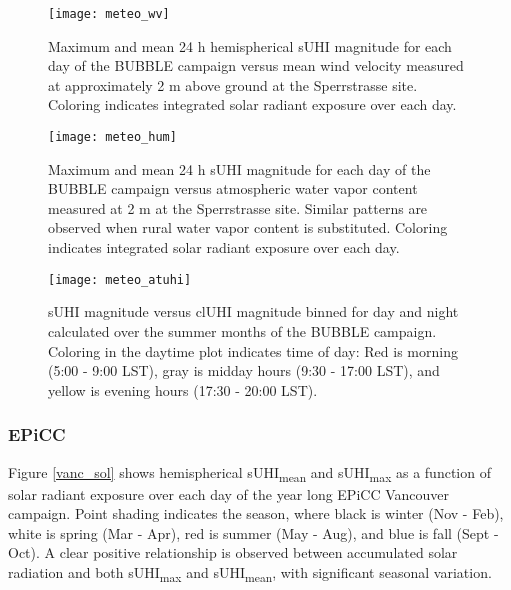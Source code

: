 \begin{bibunit}
\begin{figure}[H]
	\centering
	\texttt{[image: meteo\_wv]}
	\caption{Maximum and mean 24 \si{\hour} hemispherical sUHI magnitude for each day of the BUBBLE campaign versus mean wind velocity measured at approximately 2 \si{\meter} above ground at the Sperrstrasse site. Coloring indicates integrated solar radiant exposure over each day.}
	\label{meteo_wv}
\end{figure}

\begin{figure}[H]
	\centering
	\texttt{[image: meteo\_hum]}
	\caption{Maximum and mean 24 \si{\hour} sUHI magnitude for each day of the BUBBLE campaign versus atmospheric water vapor content measured at 2 \si{\meter} at the Sperrstrasse site. Similar patterns are observed when rural water vapor content is substituted. Coloring indicates integrated solar radiant exposure over each day.}
	\label{meteo_hum}
\end{figure}

\begin{figure}[H]
	\centering
	\texttt{[image: meteo\_atuhi]}
	\caption{sUHI magnitude versus clUHI magnitude binned for day and night calculated over the summer months of the BUBBLE campaign.  Coloring in the daytime plot indicates time of day: Red is morning (5:00 - 9:00 LST), gray is midday hours (9:30 - 17:00 LST), and yellow is evening hours (17:30 - 20:00 LST).}
	\label{meteo_atuhi}
\end{figure}

\subsubsection{EPiCC}

Figure \ref{vanc_sol} shows hemispherical sUHI\textsubscript{mean} and sUHI\textsubscript{max} as a function of solar radiant exposure over each day of the year long EPiCC Vancouver campaign. Point shading indicates the season, where black is winter (Nov - Feb), white is spring (Mar - Apr), red is summer (May - Aug), and blue is fall (Sept - Oct). A clear positive relationship is observed between accumulated solar radiation and both sUHI\textsubscript{max} and sUHI\textsubscript{mean}, with significant seasonal variation. 


\end{bibunit}
